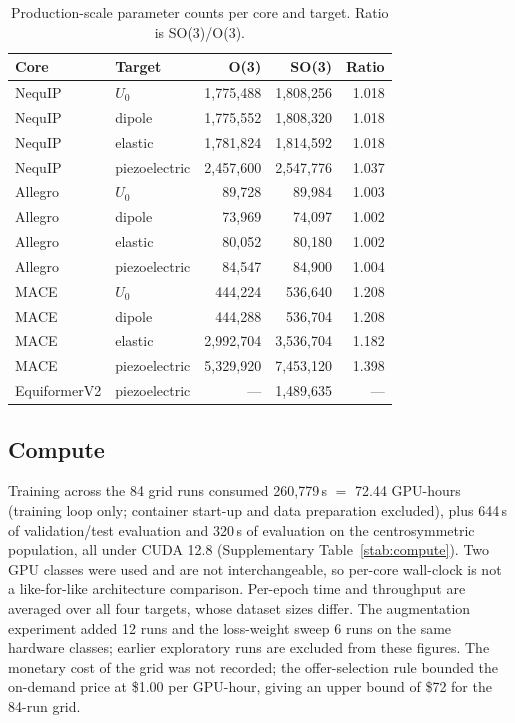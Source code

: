 \begin{table}[htbp]
\centering
\small
\caption{Production-scale parameter counts per core and target. Ratio is SO(3)/O(3).}
\label{stab:params}
\begin{tabular}{llrrr}
\toprule
Core & Target & O(3) & SO(3) & Ratio \\
\midrule
NequIP & $U_0$ & 1{,}775{,}488 & 1{,}808{,}256 & 1.018 \\
NequIP & dipole & 1{,}775{,}552 & 1{,}808{,}320 & 1.018 \\
NequIP & elastic & 1{,}781{,}824 & 1{,}814{,}592 & 1.018 \\
NequIP & piezoelectric & 2{,}457{,}600 & 2{,}547{,}776 & 1.037 \\
Allegro & $U_0$ & 89{,}728 & 89{,}984 & 1.003 \\
Allegro & dipole & 73{,}969 & 74{,}097 & 1.002 \\
Allegro & elastic & 80{,}052 & 80{,}180 & 1.002 \\
Allegro & piezoelectric & 84{,}547 & 84{,}900 & 1.004 \\
MACE & $U_0$ & 444{,}224 & 536{,}640 & 1.208 \\
MACE & dipole & 444{,}288 & 536{,}704 & 1.208 \\
MACE & elastic & 2{,}992{,}704 & 3{,}536{,}704 & 1.182 \\
MACE & piezoelectric & 5{,}329{,}920 & 7{,}453{,}120 & 1.398 \\
EquiformerV2 & piezoelectric & --- & 1{,}489{,}635 & --- \\
\bottomrule
\end{tabular}
\end{table}

\subsection*{Compute}

Training across the 84 grid runs consumed 260,779\,s $=$ 72.44 GPU-hours (training loop only; container start-up and data preparation excluded), plus 644\,s of validation/test evaluation and 320\,s of evaluation on the centrosymmetric population, all under CUDA 12.8 (Supplementary Table~\ref{stab:compute}). Two GPU classes were used and are not interchangeable, so per-core wall-clock is not a like-for-like architecture comparison. Per-epoch time and throughput are averaged over all four targets, whose dataset sizes differ. The augmentation experiment added 12 runs and the loss-weight sweep 6 runs on the same hardware classes; earlier exploratory runs are excluded from these figures. The monetary cost of the grid was not recorded; the offer-selection rule bounded the on-demand price at \$1.00 per GPU-hour, giving an upper bound of \$72 for the 84-run grid.

